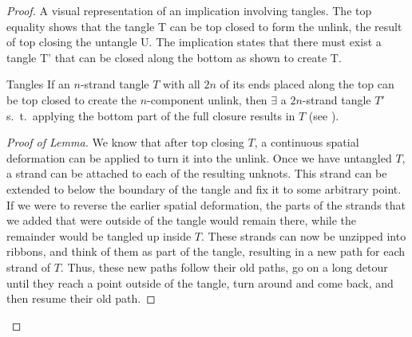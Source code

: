 \begin{paper}
\begin{proof}
{A visual representation of an implication involving tangles.
The top equality shows that the tangle T can be top closed to
form the unlink, the result of top closing the untangle U.
The implication states that there must exist a tangle T' that can be closed
along the bottom as shown to create T.}

\begin{paperlem}{Tangles}
If an $n$-strand tangle $T$ with all $2n$ of its ends placed along the top can
be top closed to create the $n$-component unlink, then $\exists$ a $2n$-strand
tangle $T'$ s.~t.~applying the bottom part of the full closure results in $T$
(see \figLemma).
\end{paperlem}

\begin{proof}[Proof of Lemma]
We know that after top closing $T$, a continuous spatial deformation can be
applied to turn it into the unlink.
Once we have untangled $T$, a strand can be attached to each of the resulting
unknots.
This strand can be extended to below the boundary of the tangle and fix it to
some arbitrary point.
If we were to reverse the earlier spatial deformation, the parts of the strands
that we added that were outside of the tangle would remain there, while the
remainder would be tangled up inside $T$.
These strands can now be unzipped into ribbons, and think of them as part of the
tangle, resulting in a new path for each strand of $T$.
Thus, these new paths follow their old paths, go on a long detour until they
reach a point outside of the tangle, turn around and come back, and then resume
their old path.


\end{proof}
\end{proof}
\end{paper}
